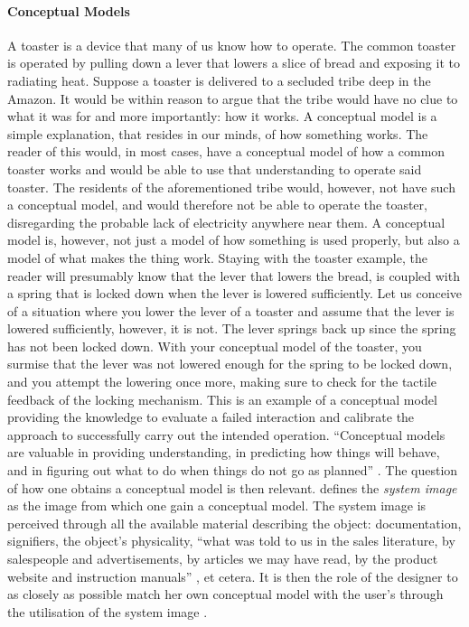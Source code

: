 \paragraph{Conceptual Models} A toaster is a device that many of us know how to operate. The common toaster is operated by pulling down a lever that lowers a slice of bread and exposing it to radiating heat. Suppose a toaster is delivered to a secluded tribe deep in the Amazon. It would be within reason to argue that the tribe would have no clue to what it was for and more importantly: how it works. A conceptual model is a simple explanation, that resides in our minds, of how something works. The reader of this would, in most cases, have a conceptual model of how a common toaster works and would be able to use that understanding to operate said toaster. The residents of the aforementioned tribe would, however, not have such a conceptual model, and would therefore not be able to operate the toaster, disregarding the probable lack of electricity anywhere near them. A conceptual model is, however, not just a model of how something is used properly, but also a model of what makes the thing work. Staying with the toaster example, the reader will presumably know that the lever that lowers the bread, is coupled with a spring that is locked down when the lever is lowered sufficiently. Let us conceive of a situation where you lower the lever of a toaster and assume that the lever is lowered sufficiently, however, it is not. The lever springs back up since the spring has not been locked down. With your conceptual model of the toaster, you surmise that the lever was not lowered enough for the spring to be locked down, and you attempt the lowering once more, making sure to check for the tactile feedback of the locking mechanism. This is an example of a conceptual model providing the knowledge to evaluate a failed interaction and calibrate the approach to successfully carry out the intended operation. ``Conceptual models are valuable in providing understanding, in predicting how things will behave, and in figuring out what to do when things do not go as planned'' \cite[p. 28]{norman}. The question of how one obtains a conceptual model is then relevant.  defines the \textit{system image} as the image from which one gain a conceptual model. The system image is perceived through all the available material describing the object: documentation, signifiers, the object's physicality, ``what was told to us in the sales literature, by salespeople and advertisements, by articles we may have read, by the product website and instruction manuals'' \cite[p. 31]{norman}, et cetera. It is then the role of the designer to as closely as possible match her own conceptual model with the user's through the utilisation of the system image \cite{norman}.

\newpage
